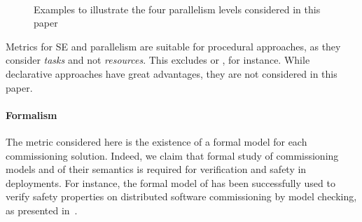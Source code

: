 \begin{figure*}[t!]
  \begin{center}
    \\

    \caption{Examples to illustrate the four parallelism levels
      considered in this paper}
    \label{fig:parlevels}
  \end{center}
\end{figure*}


Metrics for SE and parallelism are suitable for procedural approaches,
as they consider \emph{tasks} and not \emph{resources}. This excludes
\puppet or \salt, for instance. While declarative approaches have great
advantages, they are not considered in this paper.

\paragraph{Formalism}
The metric considered here is the existence of a formal model for each
commissioning solution. Indeed, we claim that formal study of
commissioning models and of their semantics is required for
verification and safety in deployments. For instance, the formal model
of \mad has been successfully used to verify safety properties on
distributed software commissioning by model checking, as presented
in~\cite{coullon:hal-02323641}.

